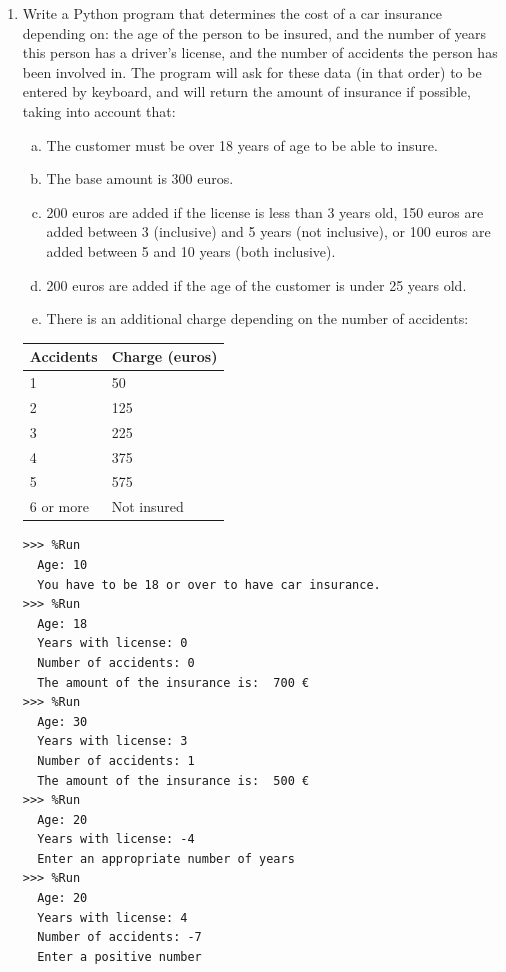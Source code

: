 \documentclass[
  fontsize=10pt,
  a4paper,
]{scrartcl}
\begin{document}
\begin{enumerate}
\item Write a Python program that determines the cost of a car insurance depending on:
the age of the person to be insured, 
and the number of years this person has a driver's license, and the number of accidents the person has been involved in. The program will ask for these data (in that order) to be entered by keyboard, and will return the amount of insurance if possible, taking into account that:
\begin{enumerate}[a)]
    \item The customer must be over 18 years of age to be able to insure.
    \item The base amount is 300 euros.
    \item 200 euros are added if the license is less than 3 years old, 150 euros are added between 3 (inclusive) and 5 years (not inclusive), or 100 euros are added between 5 and 10 years (both inclusive).
    \item 200 euros are added if the age of the customer is under 25 years old.
    \item There is an additional charge depending on the number of accidents:
\end{enumerate}

\begin{table}[htbp]
\begin{center}
\begin{tabular}{|l|l|}
\hline
Accidents & Charge (euros) \\
\hline \hline
1 & 50 \\ \hline
2 & 125 \\ \hline
3 & 225 \\ \hline
4 & 375 \\ \hline
5 & 575 \\ \hline
6 or more & Not insured \\ \hline
\end{tabular}
\label{tabla:sencilla}
\end{center}
\end{table}

\begin{small}

\begin{Verbatim}[frame=single, label={\em examples of test executions}]
>>> %Run 
  Age: 10
  You have to be 18 or over to have car insurance.
>>> %Run 
  Age: 18
  Years with license: 0
  Number of accidents: 0
  The amount of the insurance is:  700 €
>>> %Run 
  Age: 30
  Years with license: 3
  Number of accidents: 1
  The amount of the insurance is:  500 €
>>> %Run 
  Age: 20
  Years with license: -4
  Enter an appropriate number of years
>>> %Run 
  Age: 20
  Years with license: 4
  Number of accidents: -7
  Enter a positive number
\end{Verbatim}
\end{small}


\end{enumerate}
\end{document}
